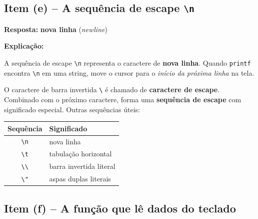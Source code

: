\documentclass[12pt,a4paper]{article}
\begin{document}
\subsection*{Item (e) -- A sequência de escape \texttt{\textbackslash n}}

\begin{respostabox}
\textbf{Resposta:} \textcolor{deitelblue}{\textbf{nova linha} (\textit{newline})}

\medskip\textbf{Explicação:}

A sequência de escape \texttt{\textbackslash n} representa o caractere de
\textbf{nova linha}. Quando \texttt{printf} encontra \texttt{\textbackslash n} em uma
string, move o cursor para o \textit{início da próxima linha} na tela.

\medskip
O caractere de barra invertida \texttt{\textbackslash} é chamado de
\textbf{caractere de escape}. Combinado com o próximo caractere, forma uma
\textbf{sequência de escape} com significado especial. Outras sequências úteis:

\begin{center}
\renewcommand{\arraystretch}{1.4}
\begin{tabular}{c l}
  \toprule \textbf{Sequência} & \textbf{Significado} \\ \midrule
  \texttt{\textbackslash n} & nova linha \\
  \texttt{\textbackslash t} & tabulação horizontal \\
  \texttt{\textbackslash\textbackslash} & barra invertida literal \\
  \texttt{\textbackslash "} & aspas duplas literais \\
  \bottomrule
\end{tabular}
\end{center}
\end{respostabox}

\subsection*{Item (f) -- A função que lê dados do teclado}
\end{document}

